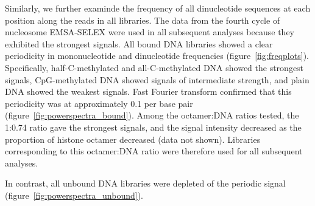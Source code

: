 \documentclass[parskip=full, numbers=noenddot]{scrbook}
\begin{document}
Similarly, we further examinde the frequency of all dinucleotide sequences at each position along the reads in all libraries.  The data from the fourth cycle of nucleosome EMSA-SELEX were used in all subsequent analyses because they exhibited the strongest signals.  All bound DNA libraries showed a clear periodicity in mononucleotide and dinucleotide frequencies (figure~\ref{fig:freqplots}).  Specifically, half-C-methylated and all-C-methylated DNA showed the strongest signals, CpG-methylated DNA showed signals of intermediate strength, and plain DNA showed the weakest signals.  Fast Fourier transform confirmed that this periodicity was at approximately 0.1 per base pair (figure~\ref{fig:powerspectra_bound}).  Among the octamer:DNA ratios tested, the 1:0.74 ratio gave the strongest signals, and the signal intensity decreased as the proportion of histone octamer decreased (data not shown).  Libraries corresponding to this octamer:DNA ratio were therefore used for all subsequent analyses.

In contrast, all unbound DNA libraries were depleted of the periodic signal (figure~\ref{fig:powerspectra_unbound}).
\end{document}

